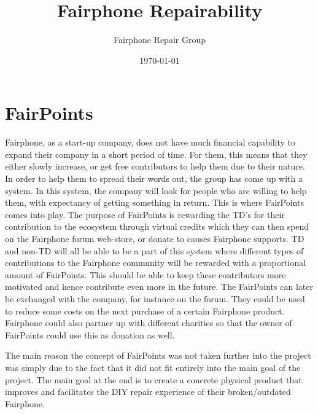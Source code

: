 \documentclass[final,a4paper]{report} %
\author{Fairphone Repair Group}
\title{Fairphone Repairability}
\date{\today}
\begin{document}
	\chapter{FairPoints}
	\label{ch:fairpoints}

	Fairphone, as a start-up company, does not have much financial capability to expand their company in a short period of time. For them, this means that they either slowly increase, or get free contributors to help them due to their nature. In order to help them to spread their words out, the group has come up with a system. In this system, the company will look for people who are willing to help them, with expectancy of getting something in return. This is where FairPoints comes into play. The purpose of FairPoints is rewarding the TD's for their contribution to the ecosystem through virtual credits which they can then spend on the Fairphone forum web-store, or donate to causes Fairphone supports. TD and non-TD will all be able to be a part of this system where different types of contributions to the Fairphone community will be rewarded with a proportional amount of FairPoints. This should be able to keep these contributors more motivated and hence contribute even more in the future. The FairPoints can later be exchanged with the company, for instance on the forum. They could be used to reduce some costs on the next purchase of a certain Fairphone product. Fairphone could also partner up with different charities so that the owner of FairPoints could use this as donation as well. 
	
	The main reason the concept of FairPoints was not taken further into the project was simply due to the fact that it did not fit entirely into the main goal of the project. The main goal at the end is to create a concrete physical product that improves and facilitates the DIY repair experience of their broken/outdated Fairphone. 
\end{document}
